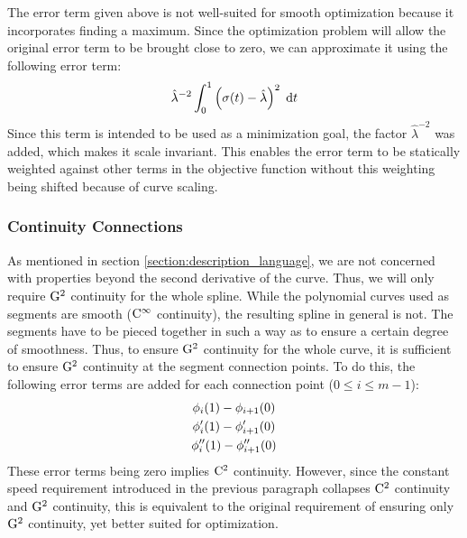 \documentclass[a4paper]{article}
\begin{document}
				The error term given above is not well-suited for smooth optimization because it incorporates finding a maximum. Since the optimization problem will allow the original error term to be brought close to zero, we can approximate it using the following error term:
				\begin{equation*}
					\hat{\lambda}^{-2}\int_{0}^{1} \left( \sigma\!\left( t \right) - \hat{\lambda} \right)^2 \; \mathrm{d}t
				\end{equation*}
				Since this term is intended to be used as a minimization goal, the factor \(\hat{\lambda}^{-2}\) was added, which makes it scale invariant. This enables the error term to be statically weighted against other terms in the objective function without this weighting being shifted because of curve scaling.

			\subsubsection{Continuity Connections}
			\label{section:continuity_connections}

				As mentioned in section \ref{section:description_language}, we are not concerned with properties beyond the second derivative of the curve. Thus, we will only require \(\mathrm{G}^{2}\) continuity for the whole spline. While the polynomial curves used as segments are smooth (\(\mathrm{C}^{\infty}\) continuity), the resulting spline in general is not. The segments have to be pieced together in such a way as to ensure a certain degree of smoothness. Thus, to ensure \(\mathrm{G}^{2}\) continuity for the whole curve, it is sufficient to ensure \(\mathrm{G}^{2}\) continuity at the segment connection points. To do this, the following error terms are added for each connection point (\(0 \leq i \leq m - 1\)):
				\begin{equation*}
					\begin{gathered}
						\phi_i\!\left( 1 \right) - \phi_{i + 1}\!\left( 0 \right)\\
						\phi'_i\!\left( 1 \right) - \phi'_{i + 1}\!\left( 0 \right)\\
						\phi''_i\!\left( 1 \right) - \phi''_{i + 1}\!\left( 0 \right)
					\end{gathered}
				\end{equation*}
				These error terms being zero implies \(\mathrm{C}^{2}\) continuity. However, since the constant speed requirement introduced in the previous paragraph collapses \(\mathrm{C}^{2}\) continuity and \(\mathrm{G}^{2}\) continuity, this is equivalent to the original requirement of ensuring only \(\mathrm{G}^{2}\) continuity, yet better suited for optimization. 
\end{document}
